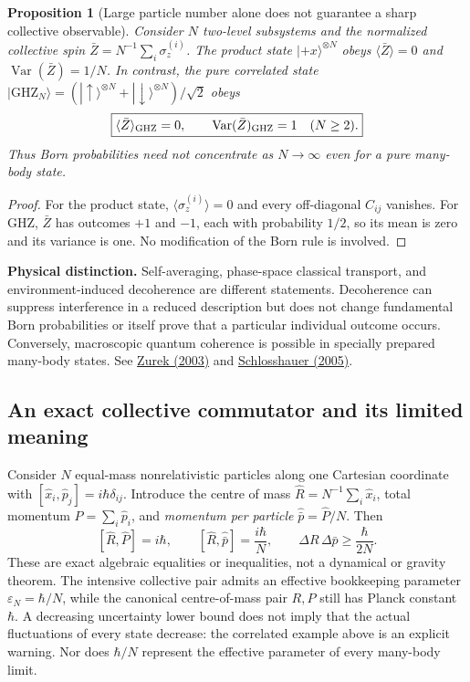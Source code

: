 \documentclass[11pt,a4paper]{article}
\newtheorem{proposition}{Proposition}[section]
\begin{document}
\begin{proposition}[Large particle number alone does not guarantee a sharp collective observable]
\label{prop:qgd-largeN-cat}
Consider $N$ two-level subsystems and the normalized collective spin $\bar Z=N^{-1}\sum_i\sigma_z^{(i)}$. The product state $|+x\rangle^{\otimes N}$ obeys $\langle\bar Z\rangle=0$ and $\operatorname{Var}(\bar Z)=1/N$. In contrast, the pure correlated state
$|\mathrm{GHZ}_N\rangle=(|\uparrow\rangle^{\otimes N}+|\downarrow\rangle^{\otimes N})/\sqrt2$ obeys
\begin{equation}\label{eq:qgd-largeN-cat}
\boxed{\langle\bar Z\rangle_{\rm GHZ}=0,\qquad
\operatorname{Var}(\bar Z)_{\rm GHZ}=1\quad(N\ge2).}
\end{equation}
Thus Born probabilities need not concentrate as $N\to\infty$ even for a pure many-body state.
\end{proposition}
\begin{proof}
For the product state, $\langle\sigma_z^{(i)}\rangle=0$ and every off-diagonal $C_{ij}$ vanishes. For GHZ, $\bar Z$ has outcomes $+1$ and $-1$, each with probability $1/2$, so its mean is zero and its variance is one. No modification of the Born rule is involved.
\end{proof}
\noindent\textbf{Physical distinction.}
Self-averaging, phase-space classical transport, and environment-induced decoherence are different statements. Decoherence can suppress interference in a reduced description but does not change fundamental Born probabilities or itself prove that a particular individual outcome occurs. Conversely, macroscopic quantum coherence is possible in specially prepared many-body states. See \href{https://doi.org/10.1103/RevModPhys.75.715}{Zurek (2003)} and \href{https://doi.org/10.1103/RevModPhys.76.1267}{Schlosshauer (2005)}.

\subsection{An exact collective commutator and its limited meaning}
\label{subsec:qgd-largeN-commutator}
Consider $N$ equal-mass nonrelativistic particles along one Cartesian coordinate with $[\hat x_i,\hat p_j]=i\hbar\delta_{ij}$. Introduce the centre of mass $\hat R=N^{-1}\sum_i\hat x_i$, total momentum $\hat P=\sum_i\hat p_i$, and \emph{momentum per particle} $\hat{\bar p}=\hat P/N$. Then
\begin{equation}\label{eq:qgd-largeN-commutator}
\boxed{[\hat R,\hat P]=i\hbar,\qquad
[\hat R,\hat{\bar p}]=\frac{i\hbar}{N},\qquad
\Delta R\,\Delta\bar p\ge\frac{\hbar}{2N}.}
\end{equation}
These are exact algebraic equalities or inequalities, not a dynamical or gravity theorem. The intensive collective pair admits an effective bookkeeping parameter $\varepsilon_N=\hbar/N$, while the canonical centre-of-mass pair $R,P$ still has Planck constant $\hbar$. A decreasing uncertainty lower bound does not imply that the actual fluctuations of every state decrease: the correlated example above is an explicit warning. Nor does $\hbar/N$ represent the effective parameter of every many-body limit.
\end{document}
